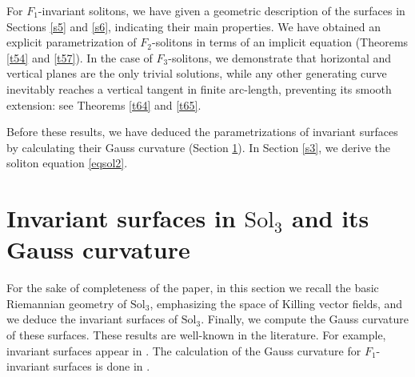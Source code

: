 \documentclass[a4paper,12pt]{amsart}
\theoremstyle{plain}
\theoremstyle{definition}
\def\sol{\text{Sol}_3}
\begin{document}
For $F_1$-invariant solitons, we have given a geometric description of the surfaces in Sections \ref{s5} and \ref{s6}, indicating their main properties. We have obtained an explicit parametrization of $F_2$-solitons in terms of an implicit equation (Theorems \ref{t54} and \ref{t57}). In the case of $F_3$-solitons, we demonstrate that horizontal and vertical planes 
are the only trivial solutions, while any other generating curve inevitably reaches 
a vertical tangent in finite arc-length, preventing its smooth extension: see Theorems \ref{t64} and \ref{t65}.

Before these results, we have deduced the parametrizations of invariant surfaces by calculating their Gauss curvature (Section \ref{s2}). In Section \ref{s3}, we derive the soliton equation \eqref{eqsol2}.
 \section{Invariant surfaces in $\sol$ and its Gauss curvature}\label{s2}
 
For the sake of completeness of the paper, in this section we recall the basic Riemannian geometry of $\sol$, emphasizing the space of Killing vector fields, and we deduce the invariant surfaces of $\sol$. Finally, we compute the Gauss curvature of these surfaces. These results are well-known in the literature. For example, invariant surfaces appear in \cite{lo2,lm1,lm3}. The calculation of the Gauss curvature for $F_1$-invariant surfaces is done in \cite{lm3}.
\end{document}
